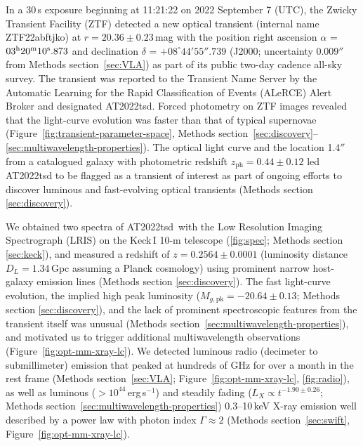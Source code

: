 \documentclass{nature_plusfigure}
\newcommand{\at}{AT2022tsd}
\begin{document}
In a 30\,s exposure beginning at 11:21:22 on 2022 September 7 (UTC), the Zwicky Transient Facility (ZTF\cite{Graham2019,Bellm2019}) detected a new optical transient (internal name ZTF22abftjko) at $r=20.36\pm0.23\,$mag with the position right ascension $\alpha$ = $03^{\rm{h}}20^{\rm{m}}10^{\rm{s}}.873$ and declination $\delta$ = $+08^{\circ} 44' 55''.739$ 
(J2000; uncertainty $0.009''$ from Methods section~\ref{sec:VLA}) as part of its public two-day cadence all-sky survey.
The transient was reported\cite{Munoz-Arancibia2022} to the Transient Name Server by the Automatic Learning for the Rapid Classification of Events (ALeRCE) Alert Broker\cite{Forster2021} and designated AT2022tsd.
Forced photometry on ZTF images\cite{Masci2019} revealed that the light-curve evolution was faster than that of typical supernovae (Figure~\ref{fig:transient-parameter-space}, Methods section~\ref{sec:discovery}--\ref{sec:multiwavelength-properties}).
The optical light curve and the location 1.4$''$ from a catalogued\cite{Beck2021} galaxy with photometric redshift $z_\mathrm{ph}=0.44\pm0.12$ led AT2022tsd to be flagged as a transient of interest as part of ongoing efforts to discover luminous and fast-evolving optical transients (Methods section \ref{sec:discovery}).

We obtained two spectra of \at\ with the Low Resolution Imaging Spectrograph (LRIS\cite{Oke1995}) on the Keck\,I 10-m telescope (\ref{fig:spec}; Methods section \ref{sec:keck}), and measured\cite{Ho2022_Astronote_Keck} a redshift of $z=0.2564\pm0.0001$ (luminosity distance $D_L=1.34\,$Gpc assuming a Planck cosmology\cite{Planck2020}) using prominent narrow host-galaxy emission lines (Methods section \ref{sec:discovery}). 
The fast light-curve evolution, the implied high peak luminosity ($M_{g,\mathrm{pk}}=-20.64\pm0.13$; Methods section \ref{sec:discovery}), and the lack of prominent spectroscopic features from the transient itself was unusual (Methods section~\ref{sec:multiwavelength-properties}), and motivated us to trigger additional multiwavelength observations (Figure~\ref{fig:opt-mm-xray-lc}).
We detected luminous radio (decimeter\cite{Ho2022Astronote_radio} to submillimeter) emission that peaked at hundreds of GHz for over a month in the rest frame (Methods section~\ref{sec:VLA}; Figure~\ref{fig:opt-mm-xray-lc}, \ref{fig:radio}),
as well as luminous ($>10^{44}\,$erg\,s$^{-1}$) and steadily fading ($L_X\propto t^{-1.90\pm0.26}$; Methods section~\ref{sec:multiwavelength-properties}) 0.3--10\,keV X-ray emission\cite{Schulze2022Astronote_xray} well described by a power law with photon index $\Gamma\approx2$ (Methods section~\ref{sec:swift}, Figure~\ref{fig:opt-mm-xray-lc}).
\end{document}
